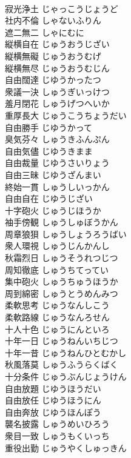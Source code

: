 \documentclass[8pt]{extreport}
\begin{document}
\begin{CJK}{UTF8}{min}
\\	寂光浄土	じゃっこうじょうど	
\\	社内不倫	しゃないふりん	
\\	遮二無二	しゃにむに	
\\	縦横自在	じゅうおうじざい	
\\	縦横無礙	じゅうおうむげ	
\\	縦横無尽	じゅうおうむじん	
\\	自由闊達	じゆうかったつ	
\\	衆議一決	しゅうぎいっけつ	
\\	羞月閉花	しゅうげつへいか	
\\	重厚長大	じゅうこうちょうだい	
\\	自由勝手	じゆうかって	
\\	臭気芬々	しゅうきふんぷん	
\\	自由気儘	じゆうきまま	
\\	自由裁量	じゆうさいりょう	
\\	自由三昧	じゆうざんまい	
\\	終始一貫	しゅうしいっかん	
\\	自由自在	じゆうじざい	
\\	十字砲火	じゅうじほうか	
\\	袖手傍観	しゅうしゅぼうかん	
\\	周章狼狽	しゅうしょうろうばい	
\\	衆人環視	しゅうじんかんし	
\\	秋霜烈日	しゅうそうれつじつ	
\\	周知徹底	しゅうちてってい	
\\	集中砲火	しゅうちゅうほうか	
\\	周到綿密	しゅうとうめんみつ	
\\	柔軟思考	じゅうなんしこう	
\\	柔軟路線	じゅうなんろせん	
\\	十人十色	じゅうにんといろ	
\\	十年一日	じゅうねんいちじつ	
\\	十年一昔	じゅうねんひとむかし	
\\	秋風落莫	しゅうふうらくばく	
\\	十分条件	じゅうぶんじょうけん	
\\	自由放題	じゆうほうだい	
\\	自由放任	じゆうほうにん	
\\	自由奔放	じゆうほんぽう	
\\	襲名披露	しゅうめいひろう	
\\	衆目一致	しゅうもくいっち	
\\	重役出勤	じゅうやくしゅっきん	

\end{CJK}
\end{document}
